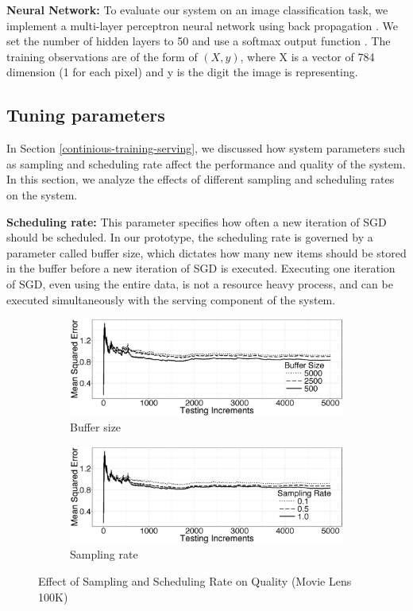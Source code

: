 \documentclass[10pt,conference,letterpaper]{IEEEtran}
\begin{document}
\textbf{Neural Network:} To evaluate our system on an image classification task, we implement a multi-layer perceptron neural network using back propagation \cite{collobert2004links}.
We set the number of hidden layers to 50 and use a softmax output function \cite{bishop2006pattern}.
The training observations are of the form of \textit{\((X,y)\)}, where X is a vector of 784 dimension (1 for each pixel) and y is the digit the image is representing.

\subsection{Tuning parameters} \label{tuning}
In Section \ref{continious-training-serving}, we discussed how system parameters such as sampling and scheduling rate affect the performance and quality of the system.
In this section, we analyze the effects of different sampling and scheduling rates on the system.

\textbf{Scheduling rate:} This parameter specifies how often a new iteration of SGD should be scheduled. 
In our prototype, the scheduling rate is governed by a parameter called buffer size, which dictates how many new items should be stored in the buffer before a new iteration of SGD is executed. 
Executing one iteration of SGD, even using the entire data, is not a resource heavy process, and can be executed simultaneously with the serving component of the system. 

\begin{figure}[h]
\begin{subfigure}{\columnwidth}
\centering
\includegraphics[width=\columnwidth]{../images/experiment-results/movie-lens-buffer-quality-improved.eps}
\caption{Buffer size}
\label{fig:movie-lens-100k-buffer-size-mse}
\end{subfigure}
\begin{subfigure}{\columnwidth}
\centering
\includegraphics[width=\columnwidth]{../images/experiment-results/movie-lens-sampling-quality-improved.eps}
\caption{Sampling rate}
\label{fig:movie-lens-100k-sample-rate}
\end{subfigure}
\vspace{2mm}
\caption{Effect of Sampling and Scheduling Rate on Quality (Movie Lens 100K)}
\end{figure}
\end{document}
